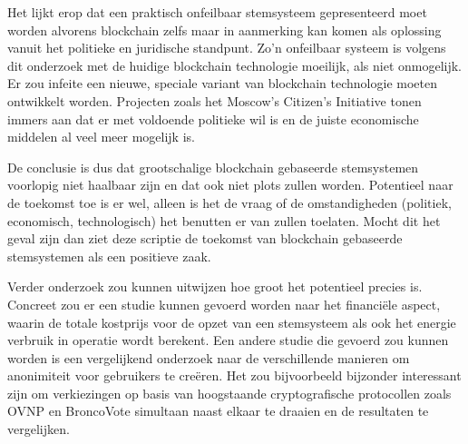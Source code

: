 Het lijkt erop dat een praktisch onfeilbaar stemsysteem gepresenteerd moet worden alvorens blockchain zelfs maar in aanmerking kan komen als oplossing vanuit het politieke en juridische standpunt. Zo'n onfeilbaar systeem is volgens dit onderzoek met de huidige blockchain technologie moeilijk, als niet onmogelijk.  Er zou infeite een nieuwe, speciale variant van blockchain technologie moeten ontwikkelt worden. Projecten zoals het Moscow's Citizen's Initiative tonen immers aan dat er met voldoende politieke wil is en de juiste economische middelen al veel meer mogelijk is. 
	
De conclusie is dus dat grootschalige blockchain gebaseerde stemsystemen voorlopig niet haalbaar zijn en dat ook niet plots zullen worden. Potentieel naar de toekomst toe is er wel, alleen is het de vraag of de omstandigheden  (politiek, economisch, technologisch) het benutten er van zullen toelaten. Mocht dit het geval zijn dan ziet deze scriptie de toekomst van blockchain gebaseerde stemsystemen als een positieve zaak.
	
Verder onderzoek zou kunnen uitwijzen hoe groot het potentieel precies is. Concreet zou er een studie kunnen gevoerd worden naar het financiële aspect, waarin de totale kostprijs voor de opzet van een stemsysteem als ook het energie verbruik in operatie wordt berekent. Een andere studie die gevoerd zou kunnen worden is een vergelijkend onderzoek naar de verschillende manieren om anonimiteit   voor gebruikers te creëren. Het zou bijvoorbeeld bijzonder interessant zijn om verkiezingen op basis van hoogstaande cryptografische protocollen zoals OVNP en BroncoVote simultaan naast elkaar te draaien en de resultaten te vergelijken.
	


